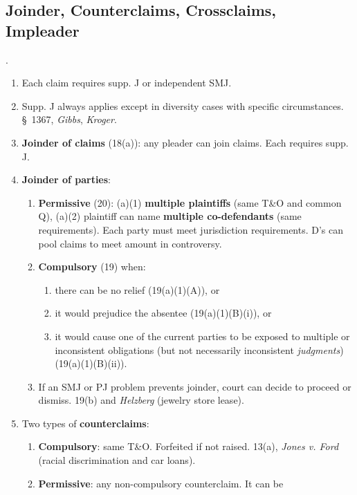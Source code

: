 \subsection{Joinder, Counterclaims, Crossclaims, Impleader}.

\begin{enumerate}
    \item Each claim requires supp. J or independent SMJ.
    \item Supp. J always applies except in diversity cases with specific 
    circumstances. \S\ 1367, \emph{Gibbs}, \emph{Kroger}.
    \item \textbf{Joinder of claims} (18(a)): any pleader can join claims.  
    Each requires supp. J.  \item \textbf{Joinder of parties}:
    \begin{enumerate}
        \item \textbf{Permissive} (20): (a)(1) \textbf{multiple plaintiffs} 
        (same T\&O and common Q), (a)(2) plaintiff can name \textbf{multiple 
        co-defendants} (same requirements). Each party must meet jurisdiction 
        requirements. D's can pool claims to meet amount in controversy.
        \item \textbf{Compulsory} (19) when:
        \begin{enumerate}
            \item there can be no relief (19(a)(1)(A)), or
            \item it would prejudice the absentee (19(a)(1)(B)(i)), or
            \item it would cause one of the current parties to be exposed to 
            multiple or inconsistent obligations (but not necessarily 
            inconsistent \emph{judgments}) (19(a)(1)(B)(ii)).
        \end{enumerate}
        \item If an SMJ or PJ problem prevents joinder, court can decide to 
        proceed or dismiss. 19(b) and \emph{Helzberg} (jewelry store lease).
    \end{enumerate}
    \item Two types of \textbf{counterclaims}:
    \begin{enumerate}
        \item \textbf{Compulsory}: same T\&O. Forfeited if not raised. 13(a), 
        \emph{Jones v. Ford} (racial discrimination and car loans).
        \item \textbf{Permissive}: any non-compulsory counterclaim. It can be 

\end{enumerate}
\end{enumerate}
